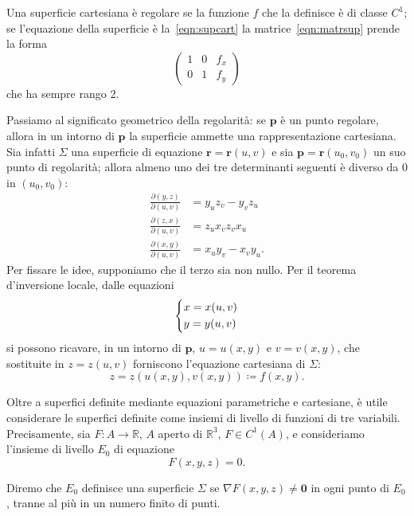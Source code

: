 \documentclass[a4paper]{book}
\numberwithin{equation}{section}
\theoremstyle{plain}
\theoremstyle{definition}
\theoremstyle{remark}
\renewcommand{\vec}{\boldsymbol}
\theoremstyle{example}
\begin{document}
Una superficie cartesiana è regolare se la funzione $f$ che la definisce è di classe $C^1$; se l'equazione della superficie è la~\eqref{eqn:supcart} la matrice~\eqref{eqn:matrsup} prende la forma
\begin{equation*}
	\begin{pmatrix}
		1 & 0 & f_x \\
		0 & 1 & f_y
	\end{pmatrix}
\end{equation*}
che ha sempre rango 2.

Passiamo al significato geometrico della regolarità: se $\vec{p}$ è un punto regolare, allora in un intorno di $\vec{p}$ la superficie ammette una rappresentazione cartesiana. Sia infatti $\Sigma$ una superficie di equazione $\vec{r} = \vec{r}(u, v)$ e sia $\vec{p} = \vec{r}(u_0, v_0)$ un suo punto di regolarità; allora almeno uno dei tre determinanti seguenti è diverso da $0$ in $(u_0, v_0)$:
\begin{align*}
	\frac{\partial (y,z)}{\partial (u,v)} &= y_uz_v - y_vz_u \\
	\frac{\partial (z, x)}{\partial (u,v)} &= z_ux_v  z_vx_u \\
	\frac{\partial (x, y)}{\partial (u, v)} &= x_uy_v - x_vy_u.
\end{align*}
Per fissare le idee, supponiamo che il terzo sia non nullo. Per il teorema d'inversione locale, dalle equazioni
\begin{equation*}
	\begin{dcases}
		x = x(u, v) \\
		y = y(u,v)
	\end{dcases}
\end{equation*}
si possono ricavare, in un intorno di $\vec{p}$, $u = u(x, y)$ e $v = v(x, y)$, che sostituite in $z = z(u, v)$ forniscono l'equazione cartesiana di $\Sigma$:
\begin{equation*}
	z = z(u(x, y), v(x, y)) \coloneqq f(x, y).
\end{equation*}

Oltre a superfici definite mediante equazioni parametriche e cartesiane, è utile considerare le superfici definite come insiemi di livello di funzioni di tre variabili. Precisamente, sia $F \colon A \to \mathbb{R}$, $A$ aperto di $\mathbb{R}^3$, $F \in C^1(A)$, e consideriamo l'insieme di livello $E_0$ di equazione
\begin{equation}
	F(x, y, z) = 0.
\end{equation}

Diremo che $E_0$ definisce una superficie $\Sigma$ se $\nabla F(x, y, z) \ne \vec{0}$ in ogni punto di $E_0$, tranne al più in un numero finito di punti.
\end{document}
